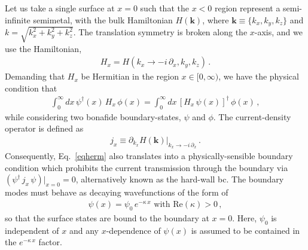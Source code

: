 \documentclass[aps,prb,onecolumn, footinbib, 10pt]{revtex4-2}
\begin{document}
Let us take a single surface at $x=0$ such that the $x<0$ region represent a semi-infinite semimetal, with the bulk Hamiltonian $H(\boldsymbol k)$, where $\boldsymbol k \equiv \lbrace k_x, k_y, k_z \rbrace $ and $k =\sqrt{k_x^2 + k_y^2 + k_z^2}$. The translation symmetry is broken along the $x$-axis, and we use the Hamiltonian,
\begin{align}
H_x = H (k_x \rightarrow -i \, \partial_x , k_y, k_z)\,.
\end{align}
Demanding that $H_x $ be Hermitian in the region $x \in [0, \infty)$, we have the physical condition that
\begin{align}
\label{eqherm}
 \int_0^\infty  dx \,\psi^\dagger (x) \, H_x\,\phi (x) = 
 \int_0^\infty  dx\, [H_x\, \psi(x) ]^\dagger\,\phi(x) \,,
\end{align}
while considering two bonafide boundary-states, $\psi $ and $\phi$. The current-density operator is defined as
\begin{align}
j_x \equiv \partial_{k_x}  H(\boldsymbol k) \vert_{k_x \rightarrow -i\, \partial_x}\,.
\end{align}
Consequently, Eq.~\eqref{eqherm} also translates into a physically-sensible boundary condition which prohibits the current transmission through the boundary via $ (\psi^\dagger \, j_x \, \psi )\vert_{x=0}= 0$, alternatively known as the hard-wall bc. The boundary modes must behave as decaying wavefunctions of the form of
\begin{align}
\psi (x) = \psi_0 \, e^{- \kappa \, x} \text{ with } \text{Re}(\kappa) > 0\,,
\end{align}
so that the surface states are bound to the boundary at $ x= 0 $. Here, $\psi_0$ is independent of $x$ and any $x$-dependence of $\psi(x)$ is assumed to be contained in the $ e^{- \kappa \, x}$ factor. 
\end{document}
